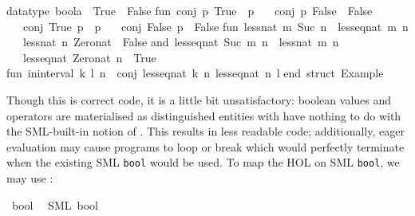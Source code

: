 \begin{isabellebody}
\begin{isamarkuptext}
\isanewline
datatype\ boola\ {\isacharequal}\ True\ {\isacharbar}\ False{\isacharsemicolon}\isanewline
\isanewline
fun\ conj\ p\ True\ {\isacharequal}\ p\isanewline
\ \ {\isacharbar}\ conj\ p\ False\ {\isacharequal}\ False\isanewline
\ \ {\isacharbar}\ conj\ True\ p\ {\isacharequal}\ p\isanewline
\ \ {\isacharbar}\ conj\ False\ p\ {\isacharequal}\ False{\isacharsemicolon}\isanewline
\isanewline
fun\ less{\isacharunderscore}nat\ m\ {\isacharparenleft}Suc\ n{\isacharparenright}\ {\isacharequal}\ less{\isacharunderscore}eq{\isacharunderscore}nat\ m\ n\isanewline
\ \ {\isacharbar}\ less{\isacharunderscore}nat\ n\ Zero{\isacharunderscore}nat\ {\isacharequal}\ False\isanewline
and\ less{\isacharunderscore}eq{\isacharunderscore}nat\ {\isacharparenleft}Suc\ m{\isacharparenright}\ n\ {\isacharequal}\ less{\isacharunderscore}nat\ m\ n\isanewline
\ \ {\isacharbar}\ less{\isacharunderscore}eq{\isacharunderscore}nat\ Zero{\isacharunderscore}nat\ n\ {\isacharequal}\ True{\isacharsemicolon}\isanewline
\isanewline
fun\ in{\isacharunderscore}interval\ {\isacharparenleft}k{\isacharcomma}\ l{\isacharparenright}\ n\ {\isacharequal}\ conj\ {\isacharparenleft}less{\isacharunderscore}eq{\isacharunderscore}nat\ k\ n{\isacharparenright}\ {\isacharparenleft}less{\isacharunderscore}eq{\isacharunderscore}nat\ n\ l{\isacharparenright}{\isacharsemicolon}\isanewline
\isanewline
end{\isacharsemicolon}\ {\isacharparenleft}{\isacharasterisk}struct\ Example{\isacharasterisk}{\isacharparenright}\isanewline%
\end{isamarkuptext}%
\isamarkuptrue%
%
\endisatagquotetypewriter
{\isafoldquotetypewriter}%
%
\isadelimquotetypewriter
%
\endisadelimquotetypewriter
%
\begin{isamarkuptext}%
\noindent Though this is correct code, it is a little bit
  unsatisfactory: boolean values and operators are materialised as
  distinguished entities with have nothing to do with the SML-built-in
  notion of .  This results in less readable code;
  additionally, eager evaluation may cause programs to loop or break
  which would perfectly terminate when the existing SML \verb|bool| would be used.  To map the HOL  on SML \verb|bool|, we may use :%
\end{isamarkuptext}%
\isamarkuptrue%
%
\isadelimquotett
%
\endisadelimquotett
%
\isatagquotett
{}\isamarkupfalse%
\ bool\isanewline
\ \ {\isacharparenleft}SML\ {\isachardoublequoteopen}bool{\isachardoublequoteclose}{\isacharparenright}\isanewline
{}\isamarkupfalse%

\end{isabellebody}
